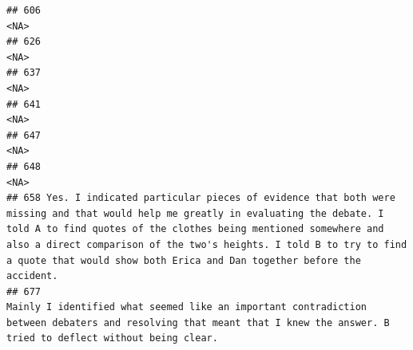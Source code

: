 \documentclass[
]{article}
\begin{document}
\begin{verbatim}
## 606                                                                                                                                                                                                                                                                                                                                                <NA>
## 626                                                                                                                                                                                                                                                                                                                                                <NA>
## 637                                                                                                                                                                                                                                                                                                                                                <NA>
## 641                                                                                                                                                                                                                                                                                                                                                <NA>
## 647                                                                                                                                                                                                                                                                                                                                                <NA>
## 648                                                                                                                                                                                                                                                                                                                                                <NA>
## 658 Yes. I indicated particular pieces of evidence that both were missing and that would help me greatly in evaluating the debate. I told A to find quotes of the clothes being mentioned somewhere and also a direct comparison of the two's heights. I told B to try to find a quote that would show both Erica and Dan together before the accident.
## 677                                                                                                                                                                          Mainly I identified what seemed like an important contradiction between debaters and resolving that meant that I knew the answer. B tried to deflect without being clear. 

\end{verbatim}
\end{document}
